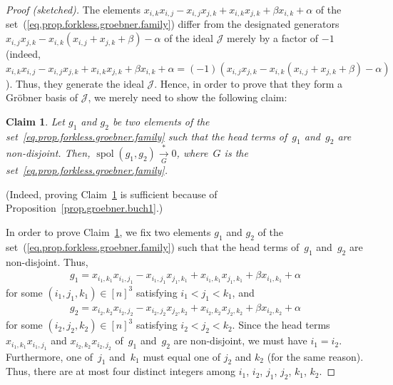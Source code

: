 \documentclass[pdftex]{sigma}
\newtheorem{Claim}[Theorem]{Claim}
 { \theoremstyle{definition}
\newtheorem{Definition}[Theorem]{Definition}
\newtheorem{Example}[Theorem]{Example}
\newtheorem{Remark}[Theorem]{Remark}
\newtheorem{question}[Theorem]{Question} }
\numberwithin{equation}{section}
\begin{document}
\begin{proof}[Proof (sketched)]The elements $x_{i,k}x_{i,j}-x_{i,j}x_{j,k}+x_{i,k}x_{j,k}+\beta x_{i,k}+\alpha$ of the set~(\ref{eq.prop.forkless.groebner.family}) differ from the designated generators
$x_{i,j}x_{j,k}-x_{i,k} ( x_{i,j}+x_{j,k}+\beta ) -\alpha$ of the ideal $\mathcal{J}$ merely by a factor of $-1$ (indeed, $x_{i,k}x_{i,j}-x_{i,j}x_{j,k}+x_{i,k}x_{j,k}+\beta x_{i,k}+\alpha= ( -1 ) ( x_{i,j}x_{j,k}-x_{i,k} ( x_{i,j}+x_{j,k}+\beta ) -\alpha ) $). Thus, they generate the ideal $\mathcal{J}$. Hence, in order to prove that they form a Gr\"{o}bner basis of $\mathcal{J}$, we merely need to show the following claim:

\begin{Claim}\label{Claim1}
Let $g_{1}$ and $g_{2}$ be two elements of the set~\eqref{eq.prop.forkless.groebner.family} such that the head terms of~$g_{1}$ and~$g_{2}$ are non-disjoint. Then, $\operatorname*{spol} ( g_{1},g_{2} ) \overset{\ast}{\underset{G}{\longrightarrow}}0$, where~$G$ is the set~\eqref{eq.prop.forkless.groebner.family}.
\end{Claim}

(Indeed, proving Claim~\ref{Claim1} is sufficient because of Proposition~\ref{prop.groebner.buch1}.)

In order to prove Claim~\ref{Claim1}, we fix two elements $g_{1}$ and $g_{2}$ of the set~(\ref{eq.prop.forkless.groebner.family}) such that the head terms of~$g_{1}$ and~$g_{2}$ are non-disjoint. Thus,
\begin{gather*}
g_{1}=x_{i_{1},k_{1}}x_{i_{1},j_{1}}-x_{i_{1},j_{1}}x_{j_{1},k_{1}} +x_{i_{1},k_{1}}x_{j_{1},k_{1}}+\beta x_{i_{1},k_{1}}+\alpha
\end{gather*}
for some $ ( i_{1},j_{1},k_{1} ) \in[n] ^{3}$ satisfying $i_{1}<j_{1}<k_{1}$, and
\begin{gather*}
g_{2}=x_{i_{2},k_{2}}x_{i_{2},j_{2}}-x_{i_{2},j_{2}}x_{j_{2},k_{2}} +x_{i_{2},k_{2}}x_{j_{2},k_{2}}+\beta x_{i_{2},k_{2}}+\alpha
\end{gather*}
for some $ ( i_{2},j_{2},k_{2} ) \in[n] ^{3}$ satisfying $i_{2}<j_{2}<k_{2}$. Since the head terms $x_{i_{1},k_{1}}x_{i_{1},j_{1}}$ and $x_{i_{2},k_{2}}x_{i_{2},j_{2}}$ of~$g_{1}$ and~$g_{2}$ are non-disjoint, we must have $i_{1}=i_{2}$. Furthermore, one of~$j_{1}$ and~$k_{1}$ must equal one of $j_{2}$ and $k_{2}$ (for the same reason). Thus, there are at most four distinct integers among $i_{1}$, $i_{2}$, $j_{1}$, $j_{2}$, $k_{1}$, $k_{2}$.


\end{proof}
\end{document}

